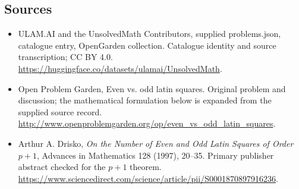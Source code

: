 \documentclass[11pt,a4paper]{article}
\begin{document}
\subsection{Sources}
\begin{itemize}
\item[S1] ULAM.AI and the UnsolvedMath Contributors, supplied problems.json, catalogue entry, OpenGarden collection. Catalogue identity and source transcription; CC BY 4.0.
\url{https://huggingface.co/datasets/ulamai/UnsolvedMath}.
\item[S2] Open Problem Garden, Even vs. odd latin squares. Original problem and discussion; the mathematical formulation below is expanded from the supplied source record.
\url{http://www.openproblemgarden.org/op/even_vs_odd_latin_squares}.

\item[R1] Arthur A. Drisko, \emph{On the Number of Even and Odd Latin
Squares of Order $p+1$}, Advances in Mathematics 128 (1997), 20--35.
Primary publisher abstract checked for the $p+1$ theorem.
\url{https://www.sciencedirect.com/science/article/pii/S0001870897916236}.

\end{itemize}
\end{document}
